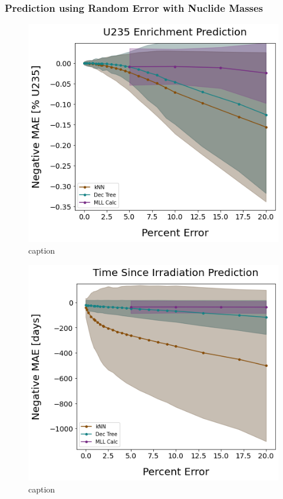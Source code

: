 \begin{frame}
  \frametitle{Prediction using Random Error with Nuclide Masses}
  \begin{minipage}{0.49\textwidth}
    \begin{figure}
      \centering
      \includegraphics[width=\linewidth]{./figures/randerr_compare_nuc29_enri.png}
      \caption{caption}
    \end{figure}
  \end{minipage}%
  \hfill
  \begin{minipage}{0.49\textwidth}
    \begin{figure}
      \centering
      \includegraphics[width=\linewidth]{./figures/randerr_compare_nuc29_cool.png}
      \caption{caption}
    \end{figure}
  \end{minipage}%
\end{frame}
